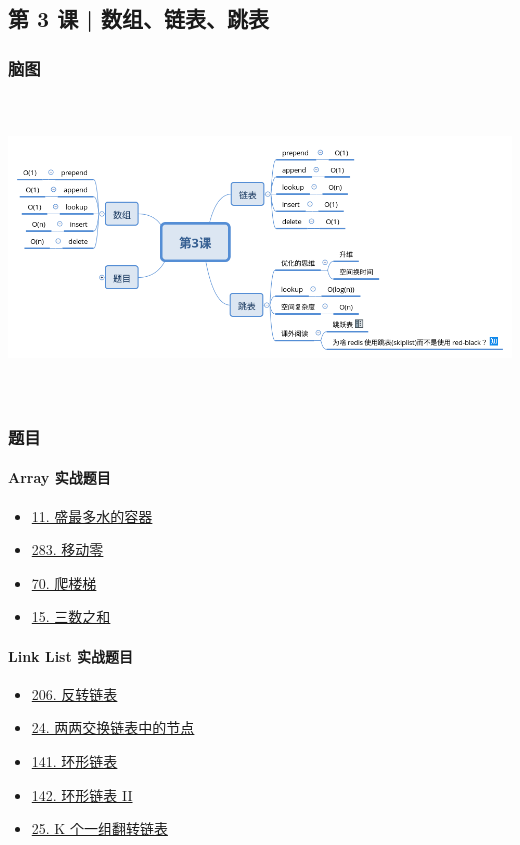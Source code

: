 \subsection{第 3 课 | 数组、链表、跳表}

\subsubsection{脑图}

\includegraphics[width=170mm,height=80mm]{images/camp/第3课.png}

\subsubsection{题目}

\paragraph{Array 实战题目}

\begin{itemize}
  \item \hyperref[leetcode:11]{11. 盛最多水的容器}
  \item \hyperref[leetcode:283]{283. 移动零}
  \item \hyperref[leetcode:70]{70. 爬楼梯}
  \item \hyperref[leetcode:15]{15. 三数之和}
\end{itemize}

\paragraph{Link List 实战题目}

\begin{itemize}
  \item \hyperref[leetcode:206]{206. 反转链表}
  \item \hyperref[leetcode:24]{24. 两两交换链表中的节点}
  \item \hyperref[leetcode:141]{141. 环形链表}
  \item \hyperref[leetcode:142]{142. 环形链表 II}
  \item \hyperref[leetcode:25]{25. K 个一组翻转链表}
\end{itemize}

